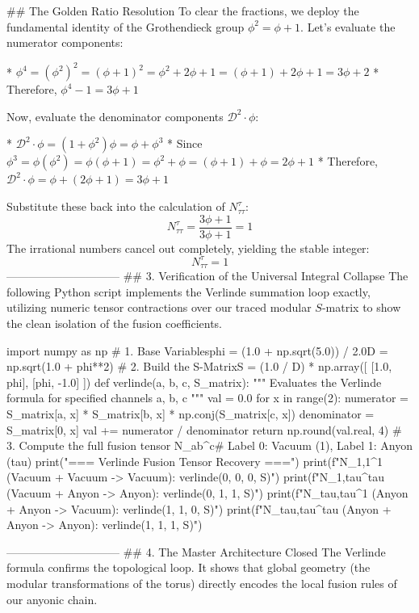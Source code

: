 ## The Golden Ratio Resolution
To clear the fractions, we deploy the fundamental identity of the Grothendieck group $\phi^2 = \phi + 1$. Let's evaluate the numerator components:

* $\phi^4 = (\phi^2)^2 = (\phi+1)^2 = \phi^2 + 2\phi + 1 = (\phi+1) + 2\phi + 1 = 3\phi + 2$
* Therefore, $\phi^4 - 1 = 3\phi + 1$

Now, evaluate the denominator components $\mathcal{D}^2 \cdot \phi$:

* $\mathcal{D}^2 \cdot \phi = (1 + \phi^2)\phi = \phi + \phi^3$
* Since $\phi^3 = \phi(\phi^2) = \phi(\phi+1) = \phi^2 + \phi = (\phi+1) + \phi = 2\phi + 1$
* Therefore, $\mathcal{D}^2 \cdot \phi = \phi + (2\phi + 1) = 3\phi + 1$

Substitute these back into the calculation of $N_{\tau\tau}^\tau$:
$$N_{\tau\tau}^\tau = \frac{3\phi + 1}{3\phi + 1} = 1$$ 
The irrational numbers cancel out completely, yielding the stable integer:
$$N_{\tau\tau}^\tau = 1$$ 
------------------------------
## 3. Verification of the Universal Integral Collapse
The following Python script implements the Verlinde summation loop exactly, utilizing numeric tensor contractions over our traced modular $S$-matrix to show the clean isolation of the fusion coefficients.

import numpy as np
# 1. Base Variablesphi = (1.0 + np.sqrt(5.0)) / 2.0D = np.sqrt(1.0 + phi**2)
# 2. Build the S-MatrixS = (1.0 / D) * np.array([
    [1.0, phi],
    [phi, -1.0]
])
def verlinde(a, b, c, S_matrix):
    """
    Evaluates the Verlinde formula for specified channels a, b, c
    """
    val = 0.0
    for x in range(2):
        numerator = S_matrix[a, x] * S_matrix[b, x] * np.conj(S_matrix[c, x])
        denominator = S_matrix[0, x]
        val += numerator / denominator
    return np.round(val.real, 4)
# 3. Compute the full fusion tensor N_ab^c# Label 0: Vacuum (1), Label 1: Anyon (tau)
print("=== Verlinde Fusion Tensor Recovery ===")
print(f"N_1,1^1 (Vacuum + Vacuum -> Vacuum): {verlinde(0, 0, 0, S)}")
print(f"N_1,tau^tau (Vacuum + Anyon -> Anyon):  {verlinde(0, 1, 1, S)}")
print(f"N_tau,tau^1 (Anyon + Anyon -> Vacuum):  {verlinde(1, 1, 0, S)}")
print(f"N_tau,tau^tau (Anyon + Anyon -> Anyon):   {verlinde(1, 1, 1, S)}")

------------------------------
## 4. The Master Architecture Closed
The Verlinde formula confirms the topological loop. It shows that global geometry (the modular transformations of the torus) directly encodes the local fusion rules of our anyonic chain.

